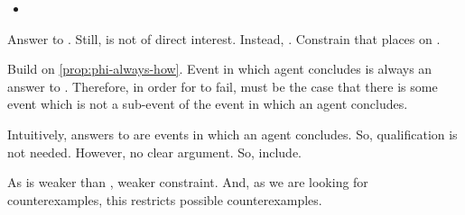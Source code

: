 \begin{note}
  \begin{link}
    \label{link:how-witnessing}
    \begin{itemize}
    \item
    \end{itemize}
    \vspace{-\baselineskip}
  \end{link}

  Answer to \qHow{}.
  Still, \qHow{} is not of direct interest.
  Instead, \issueInclusion{}.
  Constrain that \qHow{} places on \qWhy{}.

  Build on \autoref{prop:phi-always-how}.
  Event in which agent concludes is always an answer to \qHowV{}.
  Therefore, in order for \linkH{} to fail, must be the case that there is some event which is not a sub-event of the event in which an agent concludes.

  Intuitively, answers to \qHow{} are events in which an agent concludes.
  So, qualification is not needed.
  However, no clear argument.
  So, include.

  As \qHowV{} is weaker than \qHow{}, weaker constraint.
  And, as we are looking for counterexamples, this restricts possible counterexamples.
\end{note}

\section{\issueConstraint{}}
\label{cha:var:issue}

